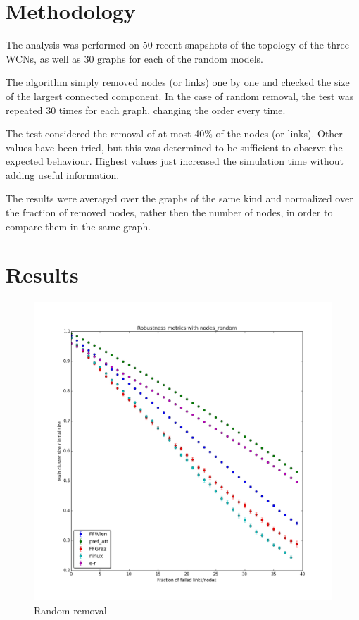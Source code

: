 \documentclass[oneside,openany]{memoir}
\begin{document}
\section{Methodology}\label{methodology}

The analysis was performed on 50 recent snapshots of the topology of the
three WCNs, as well as 30 graphs for each of the random models.

The algorithm simply removed nodes (or links) one by one and checked the
size of the largest connected component. In the case of random removal,
the test was repeated 30 times for each graph, changing the order every
time.

The test considered the removal of at most 40\% of the nodes (or links).
Other values have been tried, but this was determined to be sufficient
to observe the expected behaviour. Highest values just increased the
simulation time without adding useful information.

The results were averaged over the graphs of the same kind and
normalized over the fraction of removed nodes, rather then the number of
nodes, in order to compare them in the same graph.

\section{Results}\label{results}

\begin{figure}[htbp]
\centering
\includegraphics{./synthetic_topologies/results/20140618-1529/nodes_random_robustness.png}
\caption{Random removal}
\end{figure}
\end{document}
